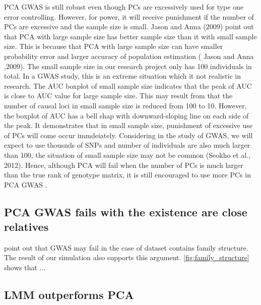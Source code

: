 \documentclass[12pt]{article}
\begin{document}
PCA GWAS is still robust even though PCs are excessively used for type one error controlling. However, for power, it will receive punishment if the number of PCs are excessive and the sample size is small.
Jason and Anna (2009) point out that PCA with large sample size has better sample size than it with small sample size.
This is because that PCA with large sample size can have smaller probability error and larger accuracy of population estimation ( Jason and Anna ,2009).
The small sample size in our research project only has 100 individuals in total.
In a GWAS study, this is an extreme situation which it not realistic in research.
The AUC boxplot of small sample size indicates that the peak of AUC is close to AUC value for large sample size.
This may result from that the number of causal loci in small sample size is reduced from 100 to 10.
However, the boxplot of AUC has a bell shap with downward-sloping line on each side of the peak.
It demonstrates that in small sample size, punishment of excessive use of PCs will come occur immdeiately.
Considering in the study of GWAS, we will expect to use thousnds of SNPs and number of individuals are also much larger than 100, the situation of small sample size may not be common (Seokho et al., 2012).
Hence, although PCA will fail when the number of PCs is much larger than the true rank of genotype matrix, it is still encouraged to use more PCs in PCA GWAS .

\subsection{PCA GWAS fails with the existence are close relatives }

\citep{price_new_2010} point out that GWAS may fail in the case of dataset contains  family structure.
The result of our simulation also supports this argument.
\cref{fig:family_structure} shows that ...

\subsection{LMM outperforms PCA }
\end{document}
